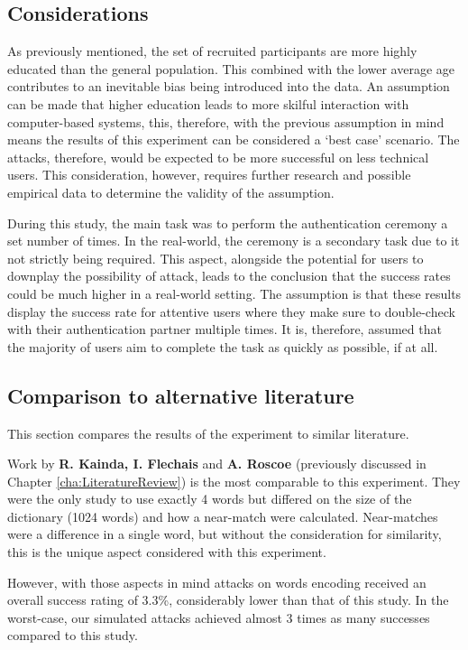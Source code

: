 \subsection*{Considerations}
As previously mentioned, the set of recruited participants are more highly educated than the general population. This combined with the lower average age contributes to an inevitable bias being introduced into the data. An assumption can be made that higher education leads to more skilful interaction with computer-based systems, this, therefore, with the previous assumption in mind means the results of this experiment can be considered a `best case' scenario. The attacks, therefore, would be expected to be more successful on less technical users. This consideration, however, requires further research and possible empirical data to determine the validity of the assumption. 

During this study, the main task was to perform the authentication ceremony a set number of times. In the real-world, the ceremony is a secondary task due to it not strictly being required. This aspect, alongside the potential for users to downplay the possibility of attack, leads to the conclusion that the success rates could be much higher in a real-world setting. The assumption is that these results display the success rate for attentive users where they make sure to double-check with their authentication partner multiple times. It is, therefore, assumed that the majority of users aim to complete the task as quickly as possible, if at all.

\subsection*{Comparison to alternative literature}
This section compares the results of the experiment to similar literature.

Work by \textbf{R. Kainda, I. Flechais} and \textbf{A. Roscoe}\cite{kainda2009usability} (previously discussed in Chapter \ref{cha:LiteratureReview}) is the most comparable to this experiment. They were the only study to use exactly 4 words but differed on the size of the dictionary (1024 words) and how a near-match were calculated. Near-matches were a difference in a single word, but without the consideration for similarity, this is the unique aspect considered with this experiment.

However, with those aspects in mind attacks on words encoding received an overall success rating of 3.3\%, considerably lower than that of this study. In the worst-case, our simulated attacks achieved almost 3 times as many successes compared to this study.

